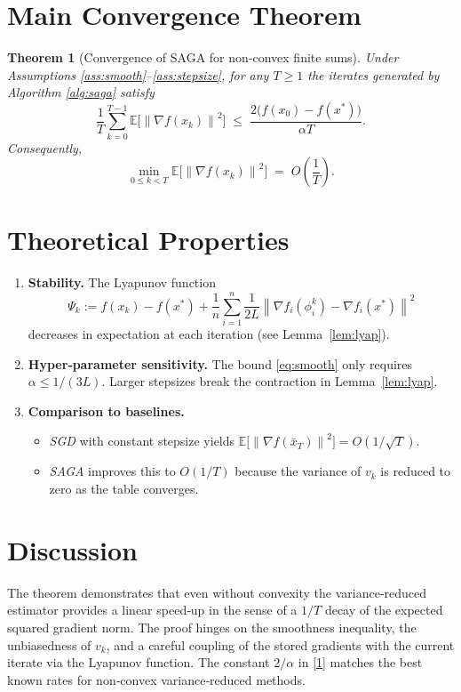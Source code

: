 \documentclass{article}
\newtheorem{theorem}{Theorem}
\newcommand{\E}{\mathbb{E}}
\newcommand{\norm}[1]{\left\|#1\right\|}
\newcommand{\grad}{\nabla}
\begin{document}
\section*{Main Convergence Theorem}
\begin{theorem}[Convergence of SAGA for non‑convex finite sums]\label{thm:main}
Under Assumptions \ref{ass:smooth}–\ref{ass:stepsize}, for any $T\ge1$ the iterates generated by
Algorithm \ref{alg:saga} satisfy
\[
\frac{1}{T}\sum_{k=0}^{T-1}\E\!\bigl[\norm{\grad f(x_k)}^{2}\bigr]
\;\le\;
\frac{2\bigl(f(x_0)-f(x^{*})\bigr)}{\alpha T}.
\tag{1}
\]
Consequently,
\[
\min_{0\le k<T}\E\!\bigl[\norm{\grad f(x_k)}^{2}\bigr]
\;=\;O\!\left(\frac{1}{T}\right).
\]
\end{theorem}

\section*{Theoretical Properties}
\begin{enumerate}[label=\arabic*.]
\item \textbf{Stability.} The Lyapunov function
\[
\Psi_k:= f(x_k)-f(x^{*})+\frac{1}{n}\sum_{i=1}^{n}
\frac{1}{2L}\norm{\grad f_i(\phi_i^{k})-\grad f_i(x^{*})}^{2}
\]
decreases in expectation at each iteration (see Lemma~\ref{lem:lyap}).
\item \textbf{Hyper‑parameter sensitivity.} The bound \eqref{eq:smooth} only requires
$\alpha\le1/(3L)$. Larger stepsizes break the contraction in Lemma~\ref{lem:lyap}.
\item \textbf{Comparison to baselines.}
\begin{itemize}
\item \emph{SGD} with constant stepsize yields $\E\!\bigl[\norm{\grad f(\bar x_T)}^{2}\bigr]=O(1/\sqrt{T})$.
\item \emph{SAGA} improves this to $O(1/T)$ because the variance of $v_k$ is reduced to zero
as the table converges.
\end{itemize}
\end{enumerate}

\section*{Discussion}
The theorem demonstrates that even without convexity the variance‑reduced estimator
provides a linear speed‑up in the sense of a $1/T$ decay of the expected squared gradient
norm. The proof hinges on the smoothness inequality, the unbiasedness of $v_k$, and a
careful coupling of the stored gradients with the current iterate via the Lyapunov
function. The constant $2/\alpha$ in \eqref{1} matches the best known rates for
non‑convex variance‑reduced methods.
\end{document}
